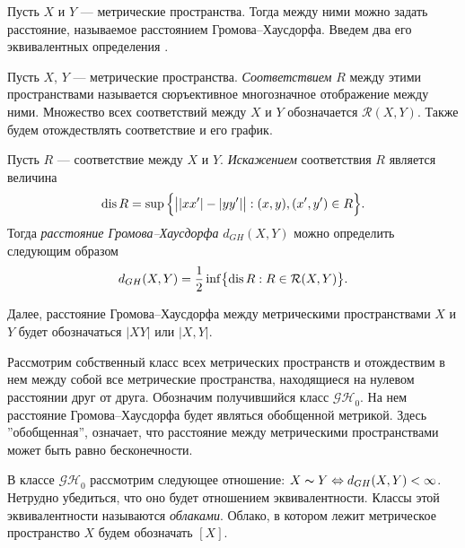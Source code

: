 Пусть $X$ и $Y$ ---
метрические пространства. Тогда между ними можно задать расстояние, называемое
расстоянием Громова--Хаусдорфа. Введем два его эквивалентных
определения \cite{Lectures}.
\begin{defin}
  Пусть $X$, $Y$ --- метрические пространства. \emph{Соответствием}
  $R$ между этими пространствами
  называется сюръективное многозначное отображение между ними.
  Множество всех соответствий между $X$ и $Y$ обозначается
  $\mathcal{R}(X,Y)$. Также будем отождествлять соответствие и его график.
\end{defin}
\begin{defin}
  Пусть $R$ --- соответствие между $X$ и $Y$.
  \emph{Искажением} соответствия $R$ является величина
  $$ \operatorname{dis}{R} = \sup{\Bigl\{ \big| |xx'| - |yy'| \big| : (x, y), (x',
  y') \in R\Bigr\}}.$$
  Тогда \emph{расстояние Громова--Хаусдорфа} $d_{GH}(X,Y)$ можно определить
  следующим образом
  $$ d_{GH}(X,Y) = \frac{1}{2}\inf \bigl\{\operatorname{dis}{R} : R \in
  \mathcal{R}(X,Y)\bigr\}.$$
  \label{defSootvet}
\end{defin}

Далее, расстояние Громова--Хаусдорфа между метрическими
пространствами $X$ и $Y$ будет обозначаться $|XY|$ или \( | X,Y | \).

Рассмотрим собственный класс всех метрических пространств и
отождествим в нем между собой все метрические пространства,
находящиеся на нулевом расстоянии друг от друга. Обозначим
получившийся класс $\mathcal{GH}_0$.  На нем расстояние
Громова--Хаусдорфа будет являться обобщенной метрикой. Здесь
''обобщенная'', означает, что расстояние между метрическими
пространствами может быть равно бесконечности.
\begin{defin} В классе $\mathcal{GH}_{0}$ рассмотрим следующее
  отношение: $X \thicksim Y \Leftrightarrow d_{GH}(X, Y) < \infty$. Нетрудно
  убедиться, что оно будет отношением эквивалентности. Классы этой
  эквивалентности
  называются \emph{облаками}. Облако, в котором лежит метрическое
  пространство $X$
  будем обозначать $[X]$.
\end{defin}


